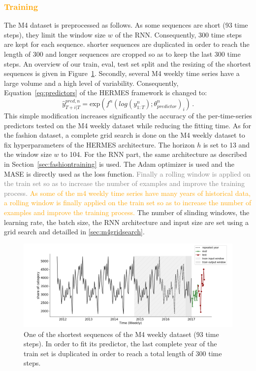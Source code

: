 \documentclass[10pt]{article} %
\newcommand{\ts}{y}
\newcommand{\tspred}{\widehat{\ts}}
\newcommand{\stat}{f}
\newcommand{\statparam}{\theta_{predictor}}
\begin{document}
\textcolor{orange}{\subsubsection{Training}}
The M4 dataset is preprocessed as follows. As some sequences are short (93 time steps), they limit the window size $w$ of the RNN.  
Consequently, 300 time steps are kept for each sequence. shorter sequences are duplicated in order to reach the length of 300 and longer sequences are cropped so as to keep the last 300 time steps. An overview of our train, eval, test set split and the resizing of the shortest sequences is given in Figure~\ref{fig:m4dataset}. Secondly, several M4 weekly time series have a large volume and a high level of variability. Consequently, Equation~\ref{eq:predictors} of the HERMES framework is changed to:
\begin{equation}
    \tspred^{pred,n}_{T+i|T} =\mbox{exp}\left( \stat^n(log\left(\ts^n_{1:T}\right);\statparam^n)_i\right)\,.
\end{equation}
This simple modification increases significantly the accuracy of the per-time-series predictors tested on the M4 weekly dataset while reducing the fitting time. As for the fashion dataset, a complete grid search is done on the M4 weekly dataset to fix hyperparameters of the HERMES architecture. The horizon $h$ is set to 13 and the window size $w$ to 104. For the RNN part, the same architecture as described in Section~\ref{sec:fashiontraining} is used. The Adam optimizer is used and the MASE is directly used as the loss function. \textcolor{gray}{Finally a rolling window is applied on the train set so as to increase the number of examples and improve the training process.} \textcolor{orange}{As some of the m4 weekly time series have many years of historical data, a rolling window is finally applied on the train set so as to increase the number of examples and improve the training process.} The number of slinding windows, the learning rate, the batch size, the RNN architecture and input size are set using a grid search and detailled in \ref{sec:m4gridsearch}.

\begin{figure}
  \centering
    \includegraphics[width=1.\linewidth]{m4_dataset}
  \caption{One of the shortest sequences of the M4 weekly dataset (93 time steps). In order to fit its predictor, the last complete year of the train set is duplicated in order to reach a total length of 300 time steps.}
\label{fig:m4dataset}
\end{figure}
\end{document}
